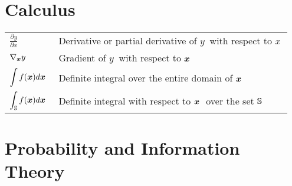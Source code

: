 \section*{Calculus}
\bgroup{}
\begin{tabular}{>{\centering}p{1.2in}p{4in}}
  \(\displaystyle  \frac{\partial y} {\partial x} ~\) & Derivative or partial derivative of \(y~\) with respect to \(x~\) \\
  \(\displaystyle  \nabla_{\bm{x}} y ~\) & Gradient of \(y~\) with respect to  \({\bm{x}}~\) \\
  \(\displaystyle  \int f({\bm{x}}) d{\bm{x}} ~\) & Definite integral over the entire domain of  \({\bm{x}}~\) \\
  \(\displaystyle  \int_{\mathbb{S}} f({\bm{x}}) d{\bm{x}}~\) & Definite integral with respect to  \({\bm{x}}~\) over the set  \({\mathbb{S}}~\) \\
\end{tabular}
\egroup{}

\section*{Probability and Information Theory}

